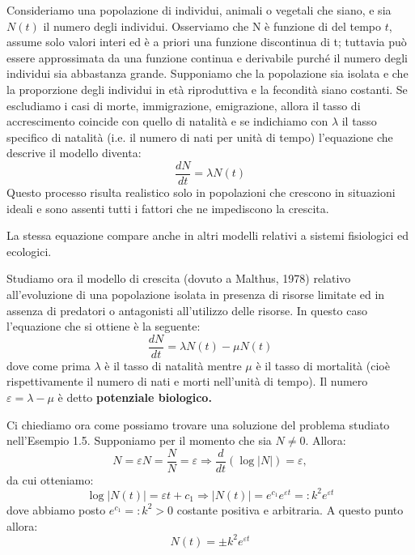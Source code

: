 \documentclass[a4paper]{article}
\newcommand{\ex}[3][]{\begin{Example}{#2}{#1}#3\end{Example}}
\begin{document}
\ex{}{
Consideriamo una popolazione di individui, animali o vegetali che siano,
e sia $N(t)$ il numero degli individui. Osserviamo che N è funzione di del tempo $t$, assume solo
valori interi ed è a priori una funzione discontinua di t; tuttavia può essere approssimata da
una funzione continua e derivabile purché il numero degli individui sia abbastanza grande.
Supponiamo che la popolazione sia isolata e che la proporzione degli individui in età riproduttiva e la fecondità siano costanti.
Se escludiamo i casi di morte, immigrazione, emigrazione, allora il tasso di accrescimento coincide con quello di natalità 
e se indichiamo con $\lambda$ il tasso specifico di natalità (i.e. il numero
di nati per unità di tempo) l'equazione che descrive il modello diventa:
\[\frac{dN}{dt} = \lambda N(t)\]
Questo processo risulta realistico solo in popolazioni che crescono in situazioni ideali e sono
assenti tutti i fattori che ne impediscono la crescita.
}
La stessa equazione compare anche in altri modelli relativi a sistemi fisiologici ed ecologici.
\ex{}{Studiamo ora il modello di crescita (dovuto a Malthus, 1978) relativo
all'evoluzione di una popolazione isolata in presenza di risorse limitate ed in assenza di predatori
o antagonisti all'utilizzo delle risorse. In questo caso l'equazione che si ottiene è la seguente:
\begin{equation*}
    \frac{dN}{dt} = \lambda N(t) - \mu N(t)
\end{equation*}
dove come prima $\lambda$ è il tasso di natalità mentre $\mu$ è il tasso di mortalità (cioè rispettivamente
il numero di nati e morti nell'unità di tempo). Il numero $\varepsilon = \lambda - \mu$ è detto \textbf{potenziale
biologico.}
}
\noindent
Ci chiediamo ora come possiamo trovare una soluzione del problema studiato nell'Esempio
1.5. Supponiamo per il momento che sia $N \neq 0$. Allora:
\begin{equation*}
N = \varepsilon N = \frac{N}{N} = \varepsilon \Longrightarrow \frac{d}{dt} (\log{|N|}) = \varepsilon,
\end{equation*}
da cui otteniamo:
\begin{equation*}
\log{|N(t)|} = \varepsilon t + c_1 \Longrightarrow |N(t)| = e^{c_1}e^{\varepsilon t} =: k^2 e^{\varepsilon t}
\end{equation*}
dove abbiamo posto $e^{c_1} =: k^2 > 0$ costante positiva e arbitraria. A questo punto allora:
\[N(t) = \pm k^2e^{\varepsilon t}\]
\end{document}
